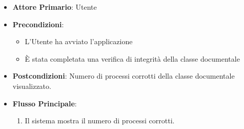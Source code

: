 \begin{itemize}
    \item \textbf{Attore Primario}: Utente
    \item \textbf{Precondizioni}: 
        \begin{itemize}
            \item L'Utente ha avviato l'applicazione
            \item È stata completata una verifica di integrità della classe documentale
        \end{itemize} 
    \item \textbf{Postcondizioni}: Numero di processi corrotti della classe documentale visualizzato.     
    \item \textbf{Flusso Principale}:
        \begin{enumerate}
            \item Il sistema mostra il numero di processi corrotti.
        \end{enumerate}
\end{itemize}

